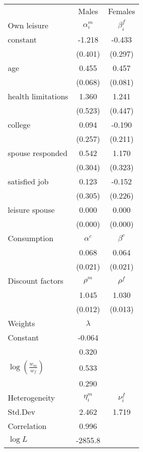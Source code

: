 \begin{tabular}{lcc} 
\hline\hline 
 & Males & Females \\ 
Own leisure & $\alpha_{i}^{m}$ & $\beta_{i}^{f}$ \\ 
constant & -1.218 & -0.433 \\ 
 & (0.401) & (0.297) \\ 
age & 0.455 & 0.457 \\ 
 & (0.068) & (0.081) \\ 
health limitations & 1.360 & 1.241 \\ 
 & (0.523) & (0.447) \\ 
college & 0.094 & -0.190 \\ 
 & (0.257) & (0.211) \\ 
spouse responded & 0.542 & 1.170 \\ 
 & (0.304) & (0.323) \\ 
satisfied job & 0.123 & -0.152 \\ 
 & (0.305) & (0.226) \\ 
leisure spouse & 0.000 & 0.000 \\ 
 & (0.000) & (0.000) \\ 
Consumption & $\alpha^{c}$ & $\beta^{c}$ \\ 
 & 0.068 & 0.064 \\ 
 & (0.021) & (0.021) \\ 
Discount factors & $\rho^m$ & $\rho^f$ \\ 
 & 1.045 & 1.030 \\ 
 & (0.012) & (0.013) \\ 
Weights & $\lambda$ &  \\ 
Constant & -0.064 &  \\ 
 & 0.320 &  \\ 
$\log(\frac{w_m}{w_f})$ & 0.533 &  \\ 
 & 0.290 &  \\ 
Heterogeneity & $\eta_i^m$ & $\nu_i^f$ \\ 
Std.Dev & 2.462 & 1.719 \\ 
Correlation & 0.996 &  \\ 
\hline 
$\log L$ & -2855.8 & \\ 
\hline \hline 
\end{tabular} 
